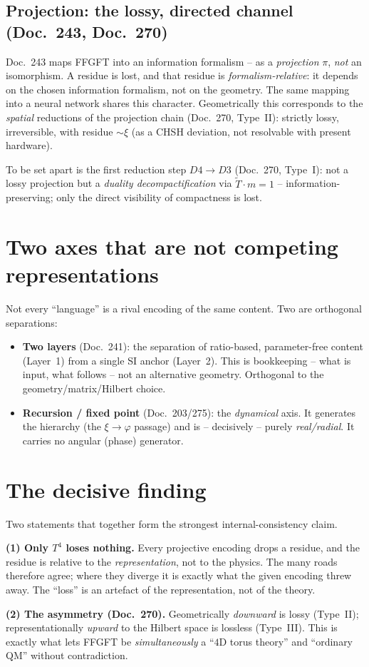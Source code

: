 \subsection{Projection: the lossy, directed channel (Doc.~243, Doc.~270)}
Doc.~243 maps FFGFT into an information formalism -- as a \emph{projection} $\pi$, \emph{not} an
isomorphism. A residue is lost, and that residue is \emph{formalism-relative}: it depends on the
chosen information formalism, not on the geometry. The same mapping into a neural network shares this
character. Geometrically this corresponds to the \emph{spatial} reductions of the projection chain
(Doc.~270, Type~II): strictly lossy, irreversible, with residue $\sim\xi$ (as a CHSH
deviation, not resolvable with present hardware).

To be set apart is the first reduction step $D4\!\to\!D3$ (Doc.~270, Type~I): not a lossy projection
but a \emph{duality decompactification} via $\tilde T\cdot m=1$ -- information-preserving; only the
direct visibility of compactness is lost.

\section{Two axes that are not competing representations}
Not every \enquote{language} is a rival encoding of the same content. Two are orthogonal separations:
\begin{itemize}
  \item \textbf{Two layers} (Doc.~241): the separation of ratio-based, parameter-free content
        (Layer~1) from a single SI anchor (Layer~2). This is bookkeeping -- what is input, what
        follows -- not an alternative geometry. Orthogonal to the geometry/matrix/Hilbert choice.
  \item \textbf{Recursion / fixed point} (Doc.~203/275): the \emph{dynamical} axis. It generates the
        hierarchy (the $\xi\!\to\!\varphi$ passage) and is -- decisively -- purely \emph{real/radial}.
        It carries no angular (phase) generator.
\end{itemize}

\section{The decisive finding}
Two statements that together form the strongest internal-consistency claim.

\begin{important}
\textbf{(1) Only $T^4$ loses nothing.} Every projective encoding drops a residue, and the residue is
relative to the \emph{representation}, not to the physics. The many roads therefore agree; where they
diverge it is exactly what the given encoding threw away. The \enquote{loss} is an artefact of the
representation, not of the theory.

\textbf{(2) The asymmetry (Doc.~270).} Geometrically \emph{downward} is lossy (Type~II);
representationally \emph{upward} to the Hilbert space is lossless (Type~III). This is exactly what
lets FFGFT be \emph{simultaneously} a \enquote{$4$D torus theory} and \enquote{ordinary QM} without
contradiction.
\end{important}

